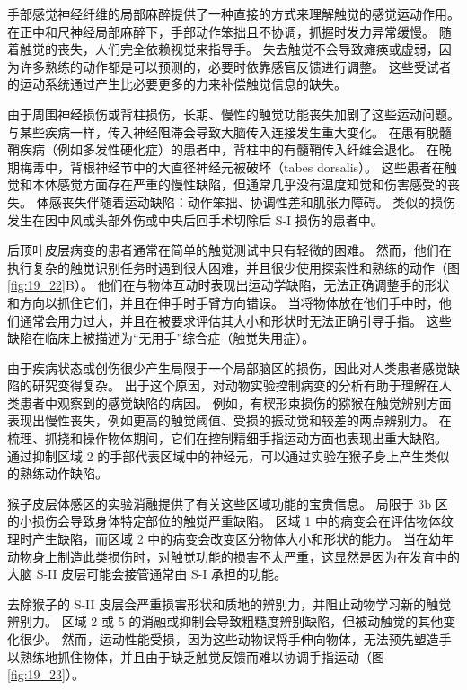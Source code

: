 手部感觉神经纤维的局部麻醉提供了一种直接的方式来理解触觉的感觉运动作用。 
在正中和尺神经局部麻醉下，手部动作笨拙且不协调，抓握时发力异常缓慢。 
随着触觉的丧失，人们完全依赖视觉来指导手。 
失去触觉不会导致瘫痪或虚弱，因为许多熟练的动作都是可以预测的，必要时依靠感官反馈进行调整。 
这些受试者的运动系统通过产生比必要更多的力来补偿触觉信息的缺失。


由于周围神经损伤或背柱损伤，长期、慢性的触觉功能丧失加剧了这些运动问题。 
与某些疾病一样，传入神经阻滞会导致大脑传入连接发生重大变化。 
在患有脱髓鞘疾病（例如多发性硬化症）的患者中，背柱中的有髓鞘传入纤维会退化。 
在晚期梅毒中，背根神经节中的大直径神经元被破坏（tabes dorsalis）。 
这些患者在触觉和本体感觉方面存在严重的慢性缺陷，但通常几乎没有温度知觉和伤害感受的丧失。 
体感丧失伴随着运动缺陷：动作笨拙、协调性差和肌张力障碍。 
类似的损伤发生在因中风或头部外伤或中央后回手术切除后 S-I 损伤的患者中。


后顶叶皮层病变的患者通常在简单的触觉测试中只有轻微的困难。 
然而，他们在执行复杂的触觉识别任务时遇到很大困难，并且很少使用探索性和熟练的动作（图 \ref{fig:19_22}B）。 
他们在与物体互动时表现出运动学缺陷，无法正确调整手的形状和方向以抓住它们，并且在伸手时手臂方向错误。 
当将物体放在他们手中时，他们通常会用力过大，并且在被要求评估其大小和形状时无法正确引导手指。 
这些缺陷在临床上被描述为“无用手”综合症（触觉失用症）。


由于疾病状态或创伤很少产生局限于一个局部脑区的损伤，因此对人类患者感觉缺陷的研究变得复杂。 
出于这个原因，对动物实验控制病变的分析有助于理解在人类患者中观察到的感觉缺陷的病因。
例如，有楔形束损伤的猕猴在触觉辨别方面表现出慢性丧失，例如更高的触觉阈值、受损的振动觉和较差的两点辨别力。 
在梳理、抓挠和操作物体期间，它们在控制精细手指运动方面也表现出重大缺陷。 
通过抑制区域 2 的手部代表区域中的神经元，可以通过实验在猴子身上产生类似的熟练动作缺陷。


猴子皮层体感区的实验消融提供了有关这些区域功能的宝贵信息。 
局限于 3b 区的小损伤会导致身体特定部位的触觉严重缺陷。 
区域 1 中的病变会在评估物体纹理时产生缺陷，而区域 2 中的病变会改变区分物体大小和形状的能力。 
当在幼年动物身上制造此类损伤时，对触觉功能的损害不太严重，这显然是因为在发育中的大脑 S-II 皮层可能会接管通常由 S-I 承担的功能。


去除猴子的 S-II 皮层会严重损害形状和质地的辨别力，并阻止动物学习新的触觉辨别力。 
区域 2 或 5 的消融或抑制会导致粗糙度辨别缺陷，但被动触觉的其他变化很少。 
然而，运动性能受损，因为这些动物误将手伸向物体，无法预先塑造手以熟练地抓住物体，并且由于缺乏触觉反馈而难以协调手指运动（图 \ref{fig:19_23}）。

